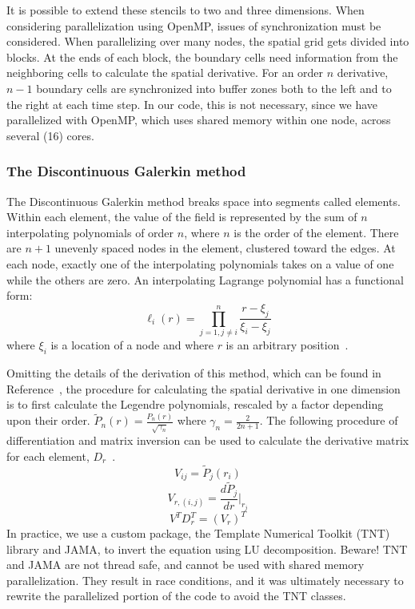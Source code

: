 It is possible to extend these stencils to two and three dimensions. When considering parallelization using OpenMP, issues of synchronization must be considered. When parallelizing over many nodes, the spatial grid gets divided into blocks. At the ends of each block, the boundary cells need information from the neighboring cells to calculate the spatial derivative. For an order $n$ derivative, $n-1$ boundary cells are synchronized into buffer zones both to the left and to the right at each time step. In our code, this is not necessary, since we have parallelized with OpenMP, which uses shared memory within one node, across several (16) cores.

\subsubsection{The Discontinuous Galerkin method}
The Discontinuous Galerkin method breaks space into segments called elements. Within each element, the value of the field is represented by the sum of $n$ interpolating polynomials of order $n$, where $n$ is the order of the element. There are $n+1$ unevenly spaced nodes in the element, clustered toward the edges. At each node, exactly one of the interpolating polynomials takes on a value of one while the others are zero. An interpolating Lagrange polynomial has a functional form:
\begin{equation}
  \ell_i(r)=\prod_{j=1,j\ne i}^{n}\frac{r-\xi_j}{\xi_i-\xi_j}
\end{equation}
where $\xi_i$ is a location of a node and where $r$ is an arbitrary position~\cite{dghesthaven}. 


Omitting the details of the derivation of this method, which can be found in Reference~\cite{dghesthaven}, the procedure for calculating the spatial derivative in one dimension is to first calculate the Legendre polynomials, rescaled by a factor depending upon their order. $\tilde{P}_n(r)=\frac{P_n(r)}{\sqrt{\gamma_n}}$ where $\gamma_n=\frac{2}{2n+1}$. The following procedure of differentiation and matrix inversion can be used to calculate the derivative matrix for each element, $D_r$~\cite{dghesthaven}.
\begin{equation}
  V_{ij}=\tilde{P}_j(r_i)
\end{equation}
\begin{equation}
  V_{r,(i,j)}=\frac{d\tilde{P}_j}{dr}|_{r_j}
\end{equation}
\begin{equation}
  V^TD_r^T=(V_r)^T
\end{equation}
In practice, we use a custom package, the Template Numerical Toolkit (TNT) library and JAMA, to invert the equation using LU decomposition. Beware! TNT and JAMA are not thread safe, and cannot be used with shared memory parallelization. They result in race conditions, and it was ultimately necessary to rewrite the parallelized portion of the code to avoid the TNT classes.

